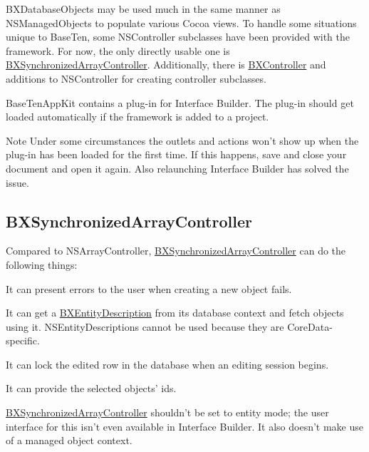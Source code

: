 B\+X\+Database\+Objects may be used much in the same manner as N\+S\+Managed\+Objects to populate various Cocoa views. To handle some situations unique to Base\+Ten, some N\+S\+Controller subclasses have been provided with the framework. For now, the only directly usable one is \hyperlink{interface_b_x_synchronized_array_controller}{B\+X\+Synchronized\+Array\+Controller}. Additionally, there is \hyperlink{protocol_b_x_controller-p}{B\+X\+Controller} and additions to N\+S\+Controller for creating controller subclasses.

Base\+Ten\+App\+Kit contains a plug-\/in for Interface Builder. The plug-\/in should get loaded automatically if the framework is added to a project.

\begin{DoxyNote}{Note}
Under some circumstances the outlets and actions won't show up when the plug-\/in has been loaded for the first time. If this happens, save and close your document and open it again. Also relaunching Interface Builder has solved the issue.
\end{DoxyNote}
\hypertarget{using_appkit_classes_bxsynchronizedarraycontroller}{}\subsection{B\+X\+Synchronized\+Array\+Controller}\label{using_appkit_classes_bxsynchronizedarraycontroller}
Compared to N\+S\+Array\+Controller, \hyperlink{interface_b_x_synchronized_array_controller}{B\+X\+Synchronized\+Array\+Controller} can do the following things\+: 
\begin{DoxyItemize}
\item It can present errors to the user when creating a new object fails. 
\item It can get a \hyperlink{interface_b_x_entity_description}{B\+X\+Entity\+Description} from its database context and fetch objects using it. N\+S\+Entity\+Descriptions cannot be used because they are Core\+Data-\/specific. 
\item It can lock the edited row in the database when an editing session begins. 
\item It can provide the selected objects' ids. 
\end{DoxyItemize}

\hyperlink{interface_b_x_synchronized_array_controller}{B\+X\+Synchronized\+Array\+Controller} shouldn't be set to entity mode; the user interface for this isn't even available in Interface Builder. It also doesn't make use of a managed object context.

